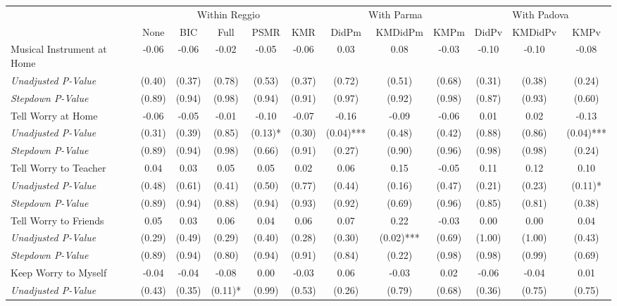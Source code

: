 \begin{tabular}{l c c c c c c c c c c c}
\toprule
& \multicolumn{5}{c}{Within Reggio} & \multicolumn{3}{c}{With Parma} & \multicolumn{3}{c}{With Padova} \\\cmidrule(lr){2-6} \cmidrule(lr){7-9} \cmidrule(lr){10-12}
 & None & BIC & Full & PSMR & KMR & DidPm & KMDidPm & KMPm & DidPv & KMDidPv & KMPv \\
\midrule
Musical Instrument at Home & -0.06 & -0.06 & -0.02 & -0.05 & -0.06 & 0.03 & 0.08 & -0.03 & -0.10 & -0.10 & -0.08 \\
\quad \textit{Unadjusted P-Value} & (0.40) & (0.37) & (0.78) & (0.53) & (0.37) & (0.72) & (0.51) & (0.68) & (0.31) & (0.38) & (0.24) \\
\quad \textit{Stepdown P-Value} & (0.89) & (0.94) & (0.98) & (0.94) & (0.91) & (0.97) & (0.92) & (0.98) & (0.87) & (0.93) & (0.60) \\
Tell Worry at Home & -0.06 & -0.05 & -0.01 & -0.10 & -0.07 & -0.16 & -0.09 & -0.06 & 0.01 & 0.02 & -0.13 \\
\quad \textit{Unadjusted P-Value} & (0.31) & (0.39) & (0.85) & (0.13)* & (0.30) & (0.04)*** & (0.48) & (0.42) & (0.88) & (0.86) & (0.04)*** \\
\quad \textit{Stepdown P-Value} & (0.89) & (0.94) & (0.98) & (0.66) & (0.91) & (0.27) & (0.90) & (0.96) & (0.98) & (0.98) & (0.24) \\
Tell Worry to Teacher & 0.04 & 0.03 & 0.05 & 0.05 & 0.02 & 0.06 & 0.15 & -0.05 & 0.11 & 0.12 & 0.10 \\
\quad \textit{Unadjusted P-Value} & (0.48) & (0.61) & (0.41) & (0.50) & (0.77) & (0.44) & (0.16) & (0.47) & (0.21) & (0.23) & (0.11)* \\
\quad \textit{Stepdown P-Value} & (0.89) & (0.94) & (0.88) & (0.94) & (0.93) & (0.92) & (0.69) & (0.96) & (0.85) & (0.81) & (0.38) \\
Tell Worry to Friends & 0.05 & 0.03 & 0.06 & 0.04 & 0.06 & 0.07 & 0.22 & -0.03 & 0.00 & 0.00 & 0.04 \\
\quad \textit{Unadjusted P-Value} & (0.29) & (0.49) & (0.29) & (0.40) & (0.28) & (0.30) & (0.02)*** & (0.69) & (1.00) & (1.00) & (0.43) \\
\quad \textit{Stepdown P-Value} & (0.89) & (0.94) & (0.80) & (0.94) & (0.91) & (0.84) & (0.22) & (0.98) & (0.98) & (0.99) & (0.69) \\
Keep Worry to Myself & -0.04 & -0.04 & -0.08 & 0.00 & -0.03 & 0.06 & -0.03 & 0.02 & -0.06 & -0.04 & 0.01 \\
\quad \textit{Unadjusted P-Value} & (0.43) & (0.35) & (0.11)* & (0.99) & (0.53) & (0.26) & (0.79) & (0.68) & (0.36) & (0.75) & (0.75) \\

\end{tabular}
